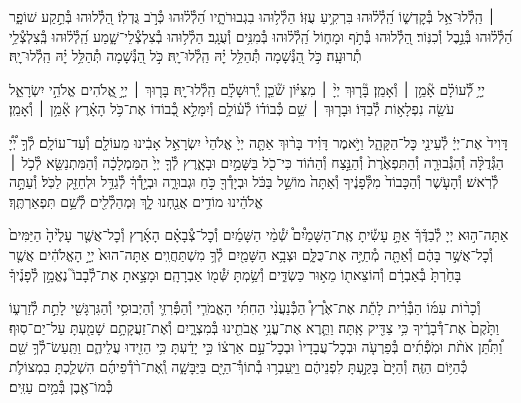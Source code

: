 \documentclass[twoside, openany, parskip=half, 11pt]{book}
\begin{document}
 ׀
הַֽלְ֯לוּ־אֵ֥ל בְּ֯קׇדְשׁ֑וֹ הַֽ֝לְ֯ל֗וּהוּ בִּרְקִ֥יעַ עֻזּֽוֹ׃
הַלְ֯ל֥וּהוּ בִגְבוּרֹתָ֑יו הַ֝לְ֯ל֗וּהוּ כְּ֯רֹ֣ב גֻּדְלֽוֹ׃
הַ֭לְ֯לוּהוּ בְּ֯תֵ֣קַע שׁוֹפָ֑ר הַ֝לְ֯ל֗וּהוּ בְּ֯נֵ֣בֶל וְ֯כִנּֽוֹר׃
הַ֭לְ֯לוּהוּ בְּ֯תֹ֣ף וּמָח֑וֹל הַֽ֝לְ֯ל֗וּהוּ בְּ֯מִנִּ֥ים וְ֯עֻגָֽב׃
הַלְ֯ל֥וּהוּ בְ֯צִלְצְ֯לֵי־שָׁ֑מַע הַֽ֝לְ֯ל֗וּהוּ בְּֽ֯צִלְצְ֯לֵ֥י תְ֯רוּעָֽה׃
כֹּ֣ל הַ֭נְּ֯שָׁמָה תְּ֯הַלֵּ֥ל יׇ֗הּ הַֽלְ֯לוּ־יׇֽהּ׃
\scriptsize{כֹּ֣ל הַ֭נְּ֯שָׁמָה תְּ֯הַלֵּ֥ל יׇ֗הּ הַֽלְ֯לוּ־יׇֽהּ׃ \\}
\normalsize{}

\negline

יְיָ֥ לְ֯֝עוֹלָ֗ם אָ֘מֵ֥ן ׀ וְ֯אָמֵֽן׃ \hfill \break
{}בָּ֘ר֤וּךְ יְיָ֨ ׀ מִצִּיּ֗וֹן שֹׁ֘כֵ֤ן יְֽ֯רוּשָׁלָ֗‍ִם הַֽלְ֯לוּ־יׇֽהּ׃ \hfill \break
{}בָּר֤וּךְ ׀ יְיָ֣ אֱ֭לֹהִים אֱלֹהֵ֣י יִשְׂרָאֵ֑ל עֹשֵׂ֖ה נִפְלָא֣וֹת לְ֯בַדּֽוֹ׃ \hfill \break
וּבָר֤וּךְ ׀ שֵׁ֥ם כְּ֯בוֹד֗וֹ לְ֯ע֫וֹלָ֥ם וְ֯יִמָּלֵ֣א כְ֭֯בוֹדוֹ אֶת־כֹּ֥ל הָאָ֗רֶץ אָ֘מֵ֥ן ׀ וְ֯אָמֵֽן׃





דָּוִיד֙ אֶת־יְיָ֔ לְ֯עֵינֵ֖י כׇּל־הַקָּהָ֑ל וַיֹּ֣אמֶר דָּוִ֗יד בָּר֨וּךְ אַתָּ֤ה יְיָ֙ אֱלֹהֵי֙ יִשְׂרָאֵ֣ל אָבִ֔ינוּ מֵעוֹלָ֖ם וְ֯עַד־עוֹלָֽם׃
לְ֯ךָ֣ יְ֠יָ֠ הַגְּ֯דֻלָּ֨ה וְ֯הַגְּ֯בוּרָ֤ה וְ֯הַתִּפְאֶ֙רֶת֙ וְ֯הַנֵּ֣צַח וְ֯הַה֔וֹד כִּי־כֹ֖ל בַּשָּׁמַ֣יִם וּבָאָ֑רֶץ לְ֯ךָ֤ יְיָ֙ הַמַּמְלָכָ֔ה וְ֯הַמִּתְנַשֵּׂ֖א לְ֯כֹ֥ל ׀ לְ֯רֹֽאשׁ׃
וְ֯הָעֹ֤שֶׁר וְ֯הַכָּבוֹד֙ מִלְּ֯פָנֶ֔יךָ וְ֯אַתָּה֙ מוֹשֵׁ֣ל בַּכֹּ֔ל וּבְיָדְ֯ךָ֖ כֹּ֣חַ וּגְבוּרָ֑ה וּבְיָ֣דְ֯ךָ֔ לְ֯גַדֵּ֥ל וּלְחַזֵּ֖ק לַכֹּֽל׃
וְ֯עַתָּ֣ה אֱלֹהֵ֔ינוּ מוֹדִ֥ים אֲנַ֖חְנוּ לָ֑ךְ וּֽמְהַלְ֯לִ֖ים לְ֯שֵׁ֥ם תִּפְאַרְתֶּֽךָ׃





אַתָּה־ה֣וּא
יְיָ לְ֯בַדֶּ֒ךָ֒ אַתָּ֣ עָשִׂ֡יתָ אֶֽת־הַשָּׁמַ֩יִם֩ שְׁ֯מֵ֨י הַשָּׁמַ֜יִם וְ֯כׇל־צְ֯בָאָ֗ם הָאָ֜רֶץ וְ֯כׇל־אֲשֶׁ֤ר עָלֶ֙יהָ֙ הַיַּמִּים֙ וְ֯כׇל־אֲשֶׁ֣ר בָּהֶ֔ם וְ֯אַתָּ֖ה מְ֯חַיֶּ֣ה אֶת־כֻּלָּ֑ם וּצְבָ֥א הַשָּׁמַ֖יִם לְ֯ךָ֥ מִשְׁתַּחֲוִֽים׃
אַתָּה־הוּא֙ יְיָ֣ הָאֱלֹהִ֔ים אֲשֶׁ֤ר בָּחַ֙רְתָּ֙ בְּ֯אַבְרָ֔ם וְ֯הוֹצֵאת֖וֹ מֵא֣וּר כַּשְׂדִּ֑ים וְ֯שַׂ֥מְתָּ שְּׁ֯מ֖וֹ אַבְרָהָֽם׃ וּמָצָ֣אתָ אֶת־לְ֯בָבוֹ֮ נֶאֱמָ֣ן לְ֯פָנֶ֒יךָ֒

וְ֯כָר֨וֹת עִמּ֜וֹ הַבְּ֯רִ֗ית לָתֵ֡ת אֶת־אֶ֩רֶץ֩ הַכְּ֯נַעֲנִ֨י הַחִתִּ֜י הָאֱמֹרִ֧י וְ֯הַפְּ֯רִזִּ֛י וְ֯הַיְבוּסִ֥י וְ֯הַגִּרְגָּשִׁ֖י לָתֵ֣ת לְ֯זַרְע֑וֹ וַתָּ֙קֶם֙ אֶת־דְּ֯בָרֶ֔יךָ כִּ֥י צַדִּ֖יק אָֽתָּה׃ וַתֵּ֛רֶא אֶת־עֳנִ֥י אֲבֹתֵ֖ינוּ בְּ֯מִצְרָ֑יִם וְ֯אֶת־זַעֲקָתָ֥ם שָׁמַ֖עְתָּ עַל־יַם־סֽוּף׃ וַ֠תִּתֵּ֠ן אֹתֹ֨ת וּמֹֽפְ֯תִ֜ים בְּ֯פַרְעֹ֤ה וּבְכׇל־עֲבָדָיו֙ וּבְכׇל־עַ֣ם אַרְצ֔וֹ כִּ֣י יָדַ֔עְתָּ כִּ֥י הֵזִ֖ידוּ עֲלֵיהֶ֑ם וַתַּֽעַשׂ־לְ֯ךָ֥ שֵׁ֖ם כְּ֯הַיּ֥וֹם הַזֶּֽה׃
וְ֯הַיָּם֙ בָּקַ֣עְתָּ לִפְנֵיהֶ֔ם וַיַּֽעַבְר֥וּ בְ֯תוֹךְ֯־הַיָּ֖ם בַּיַּבָּשָׁ֑ה וְֽ֯אֶת־רֹ֨דְ֯פֵיהֶ֜ם הִשְׁלַ֧כְתָּ בִמְצוֹלֹ֛ת כְּ֯מוֹ־אֶ֖בֶן בְּ֯מַ֥יִם עַזִּֽים׃
\end{document}
